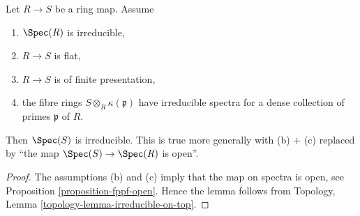 \begin{lemma}
\label{lemma-flat-fibres-irreducible}
Let $R \to S$ be a ring map. Assume
\begin{enumerate}
\item[(a)] $\Spec(R)$ is irreducible,
\item[(b)] $R \to S$ is flat,
\item[(c)] $R \to S$ is of finite presentation,
\item[(d)] the fibre rings $S \otimes_R \kappa(\mathfrak p)$
have irreducible spectra for a dense collection of primes $\mathfrak p$ of $R$.
\end{enumerate}
Then $\Spec(S)$ is irreducible.
This is true more generally with (b) $+$ (c)
replaced by ``the map $\Spec(S) \to \Spec(R)$ is open''.
\end{lemma}

\begin{proof}
The assumptions (b) and (c) imply that the map on spectra is open,
see
Proposition \ref{proposition-fppf-open}.
Hence the lemma follows from
Topology, Lemma \ref{topology-lemma-irreducible-on-top}.
\end{proof}
